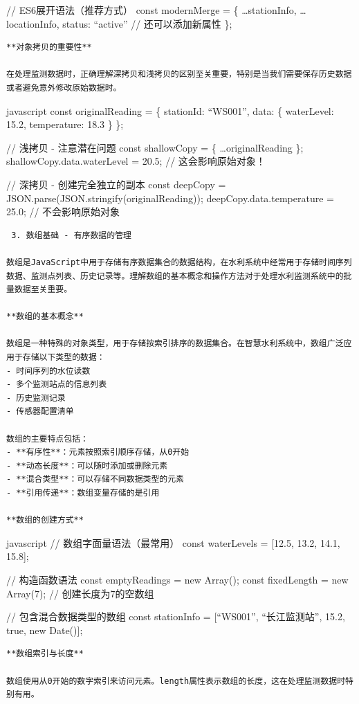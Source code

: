 {// ES6展开语法（推荐方式） const modernMerge = \{ \ldots stationInfo, \ldots locationInfo, status: ``active'' // 还可以添加新属性 \};

\begin{lstlisting}
**对象拷贝的重要性**

在处理监测数据时，正确理解深拷贝和浅拷贝的区别至关重要，特别是当我们需要保存历史数据或者避免意外修改原始数据时。
\end{lstlisting}

javascript const originalReading = \{ stationId: ``WS001'', data: \{ waterLevel: 15.2, temperature: 18.3 \} \};

// 浅拷贝 - 注意潜在问题 const shallowCopy = \{ \ldots originalReading \}; shallowCopy.data.waterLevel = 20.5; // 这会影响原始对象！

// 深拷贝 - 创建完全独立的副本 const deepCopy = JSON.parse(JSON.stringify(originalReading)); deepCopy.data.temperature = 25.0; // 不会影响原始对象

\begin{lstlisting}
 3. 数组基础 - 有序数据的管理

数组是JavaScript中用于存储有序数据集合的数据结构，在水利系统中经常用于存储时间序列数据、监测点列表、历史记录等。理解数组的基本概念和操作方法对于处理水利监测系统中的批量数据至关重要。

**数组的基本概念**

数组是一种特殊的对象类型，用于存储按索引排序的数据集合。在智慧水利系统中，数组广泛应用于存储以下类型的数据：
- 时间序列的水位读数
- 多个监测站点的信息列表  
- 历史监测记录
- 传感器配置清单

数组的主要特点包括：
- **有序性**：元素按照索引顺序存储，从0开始
- **动态长度**：可以随时添加或删除元素
- **混合类型**：可以存储不同数据类型的元素
- **引用传递**：数组变量存储的是引用

**数组的创建方式**
\end{lstlisting}

javascript // 数组字面量语法（最常用） const waterLevels = {[}12.5, 13.2, 14.1, 15.8{]};

// 构造函数语法 const emptyReadings = new Array(); const fixedLength = new Array(7); // 创建长度为7的空数组

// 包含混合数据类型的数组 const stationInfo = {[}``WS001'', ``长江监测站'', 15.2, true, new Date(){]};

\begin{lstlisting}
**数组索引与长度**

数组使用从0开始的数字索引来访问元素。length属性表示数组的长度，这在处理监测数据时特别有用。
\end{lstlisting}

}
